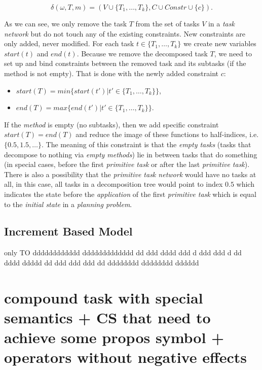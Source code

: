 \[
\delta(\omega, T, m) = (V \cup \{ T_1, \dots, T_k \}, C \cup Constr \cup \{c\}).
\]

\noindent
As we can see, we only remove the task $T$ from the set of tasks $V$ in a \emph{task network} but do not touch any of the existing constraints. New constraints are only added, never modified. For each task $t \in \{ T_1, \dots, T_k \}$ we create new variables $start(t)$ and $end(t)$. Because we remove the decomposed task $T$, we need to set up and bind constraints between the removed task and its subtasks (if the method is not empty). That is done with the newly added constraint $c$:

\begin{itemize}
    \item $start(T) = min\{ start(t') | t' \in \{ T_1, \dots, T_k \}\}$,

    \item $end(T) = max\{ end(t') | t' \in \{ T_1, \dots, T_k \}\}$.
\end{itemize}

\noindent
If the \emph{method} is empty (no subtasks), then we add specific constraint $start(T) = end(T)$ and reduce the image of these functions to half-indices, i.e. $\{ 0.5, 1.5, \dots\}$. The meaning of this constraint is that the \emph{empty tasks} (tasks that decompose to nothing via \emph{empty methods}) lie in between tasks that do something (in special cases, before the first \emph{primitive task} or after the last \emph{primitive task}). There is also a possibility that the \emph{primitive task network} would have no tasks at all, in this case, all tasks in a decomposition tree would point to index $0.5$ which indicates the state before the \emph{application} of the first \emph{primitive task} which is equal to the \emph{initial state} in a \emph{planning problem}.

\subsection{Increment Based Model}
only TO
dddddddddddd ddddddddddddd dd ddd dddd ddd d ddd ddd d dd dddd ddddd dd ddd ddd ddd dd dddddddd dddddddd dddddd
 
\section{compound task with special semantics + CS that need to achieve some propos symbol + operators without negative effects}
